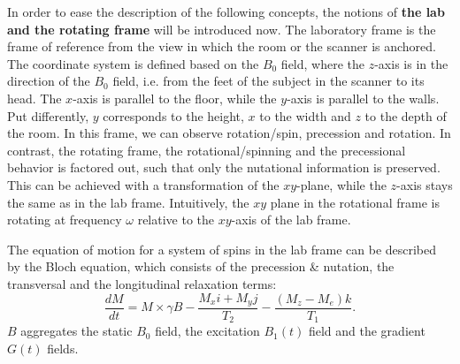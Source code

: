 \begin{table}[h]
 \noindent{}
 \caption{Longitudinal relaxation $T_1$ and transversal relaxation $T_2$ time constants for typical tissue types at 1.5 T main magnetic field strength ~\autocite{plewes_physics_2012}.}
 \label{t1t2-vals}
\end{table}

In order to ease the description of the following concepts, the notions of \textbf{the lab and the rotating frame} will be introduced now.
The laboratory frame is the frame of reference from the view in which the room or the scanner is anchored.
The coordinate system is defined based on the $B_0$ field, where the $z$-axis is in the direction of the $B_0$ field, i.e. from the feet of the subject in the scanner to its head.
The $x$-axis is parallel to the floor, while the $y$-axis is parallel to the walls.
Put differently, $y$ corresponds to the height, $x$ to the width and $z$ to the depth of the room.
In this frame, we can observe rotation/spin, precession and rotation.
In contrast, the rotating frame, the rotational/spinning and the precessional behavior is factored out, such that only the nutational information is preserved.
This can be achieved with a transformation of the $xy$-plane, while the $z$-axis stays the same as in the lab frame.
Intuitively, the $xy$ plane in the rotational frame is rotating at frequency $\omega$ relative to the $xy$-axis of the lab frame.

The equation of motion for a system of spins in the lab frame can be described by the Bloch equation, which consists of the precession \& nutation, the transversal and the longitudinal relaxation terms:
\[ \frac{dM}{dt} = M \times \gamma B - \frac{M_x i + M_y j}{T_2} - \frac{(M_z - M_e) k }{T_1}. \]
$B$ aggregates the static $B_0$ field, the excitation $B_1(t)$ field and the gradient $G(t)$ fields.

